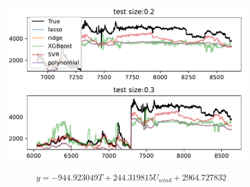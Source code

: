 \begin{figure}[H]
\begin{center}\includegraphics[width = 0.95\textwidth]{figures/output_42_0.pdf}\end{center}
\vspace{-0.7cm}
\caption{}
\label{fig:}
\end{figure}
\begin{equation}
y = - 944.923049 T + 244.319815 U_{wind} + 2964.727832
\label{eq:model_polynomial}
\end{equation}
